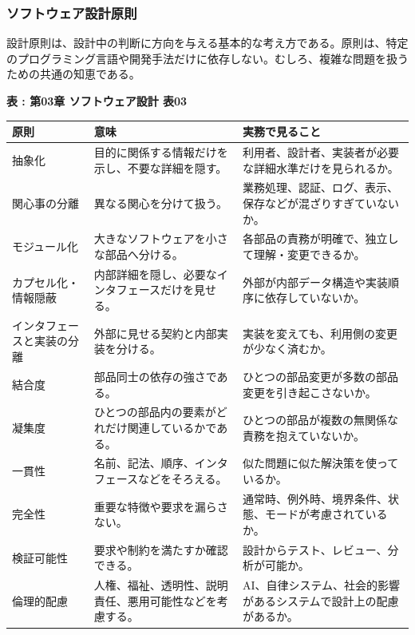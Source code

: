 \subsubsection{ソフトウェア設計原則}

設計原則は、設計中の判断に方向を与える基本的な考え方である。原則は、特定のプログラミング言語や開発手法だけに依存しない。むしろ、複雑な問題を扱うための共通の知恵である。

\par\smallskip\noindent{}\label{tab:ch03-03}\textbf{表 \thetable: 第03章 ソフトウェア設計 表03}\par\smallskip
\begin{longtable}{L{34mm}L{55mm}L{76mm}}
\toprule
\textbf{原則} & \textbf{意味} & \textbf{実務で見ること} \\
\midrule
\endhead
抽象化 & 目的に関係する情報だけを示し、不要な詳細を隠す。 & 利用者、設計者、実装者が必要な詳細水準だけを見られるか。 \\
関心事の分離 & 異なる関心を分けて扱う。 & 業務処理、認証、ログ、表示、保存などが混ざりすぎていないか。 \\
モジュール化 & 大きなソフトウェアを小さな部品へ分ける。 & 各部品の責務が明確で、独立して理解・変更できるか。 \\
カプセル化・情報隠蔽 & 内部詳細を隠し、必要なインタフェースだけを見せる。 & 外部が内部データ構造や実装順序に依存していないか。 \\
インタフェースと実装の分離 & 外部に見せる契約と内部実装を分ける。 & 実装を変えても、利用側の変更が少なく済むか。 \\
結合度 & 部品同士の依存の強さである。 & ひとつの部品変更が多数の部品変更を引き起こさないか。 \\
凝集度 & ひとつの部品内の要素がどれだけ関連しているかである。 & ひとつの部品が複数の無関係な責務を抱えていないか。 \\
一貫性 & 名前、記法、順序、インタフェースなどをそろえる。 & 似た問題に似た解決策を使っているか。 \\
完全性 & 重要な特徴や要求を漏らさない。 & 通常時、例外時、境界条件、状態、モードが考慮されているか。 \\
検証可能性 & 要求や制約を満たすか確認できる。 & 設計からテスト、レビュー、分析が可能か。 \\
倫理的配慮 & 人権、福祉、透明性、説明責任、悪用可能性などを考慮する。 & AI、自律システム、社会的影響があるシステムで設計上の配慮があるか。 \\
\bottomrule
\end{longtable}

